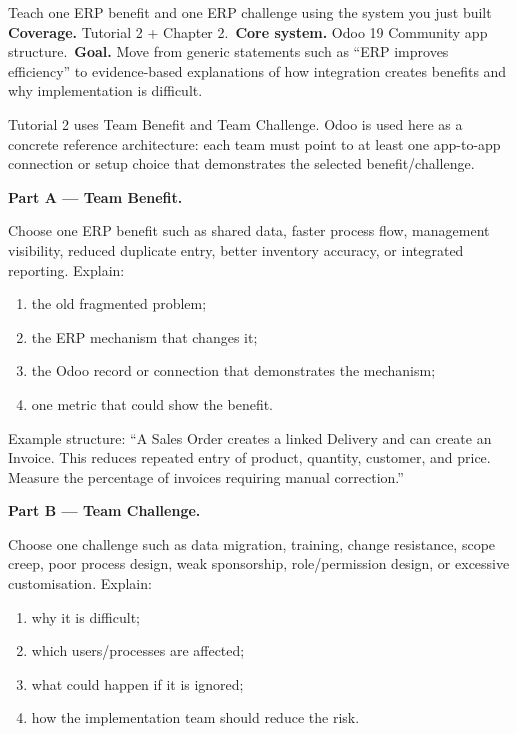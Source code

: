 
\begin{labproject}{Teach one ERP benefit and one ERP challenge using the system you just built}
\textbf{Coverage.} Tutorial 2 + Chapter 2.\
\textbf{Core system.} Odoo 19 Community app structure.\
\textbf{Goal.} Move from generic statements such as ``ERP improves efficiency'' to evidence-based explanations of how integration creates benefits and why implementation is difficult.

\begin{labmode}
Tutorial 2 uses Team Benefit and Team Challenge. Odoo is used here as a concrete reference architecture: each team must point to at least one app-to-app connection or setup choice that demonstrates the selected benefit/challenge.
\end{labmode}

\medskip\noindent\textbf{Part A --- Team Benefit.}

Choose one ERP benefit such as shared data, faster process flow, management visibility, reduced duplicate entry, better inventory accuracy, or integrated reporting. Explain:
\begin{enumerate}
  \item the old fragmented problem;
  \item the ERP mechanism that changes it;
  \item the Odoo record or connection that demonstrates the mechanism;
  \item one metric that could show the benefit.
\end{enumerate}

Example structure: ``A Sales Order creates a linked Delivery and can create an Invoice. This reduces repeated entry of product, quantity, customer, and price. Measure the percentage of invoices requiring manual correction.''

\medskip\noindent\textbf{Part B --- Team Challenge.}

Choose one challenge such as data migration, training, change resistance, scope creep, poor process design, weak sponsorship, role/permission design, or excessive customisation. Explain:
\begin{enumerate}
  \item why it is difficult;
  \item which users/processes are affected;
  \item what could happen if it is ignored;
  \item how the implementation team should reduce the risk.
\end{enumerate}


\end{labproject}
